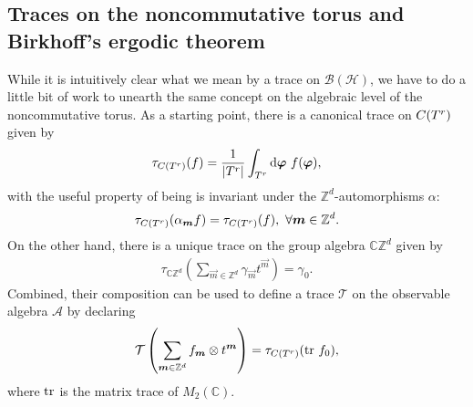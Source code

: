 \documentclass[submission, Phys]{SciPost}
\begin{document}
\subsection{Traces on the noncommutative torus and Birkhoff's ergodic theorem}
\label{subsec:ergodicity}

While it is intuitively clear what we mean by a trace on $\mathcal{B}(\mathcal{H})$, we have to do a little bit of work to unearth the same concept on the algebraic level of the noncommutative torus.
As a starting point, there is a canonical trace on $C(T^r)$ given by
\begin{align}
    \tau_{C(T^r)}(f) = \frac{1}{|T^r|} \int_{T^r}\mathrm{d} \boldsymbol{\varphi} ~ f( \boldsymbol{\varphi}),
\end{align}
with the useful property of being is invariant under the $\mathbb{Z}^d$-automorphisms $\alpha$: 
\begin{equation}
    \tau_{C(T^r)}(\alpha_{\boldsymbol{m}}f) = \tau_{C(T^r)}(f), ~ \forall  \boldsymbol{m}\in \mathbb{Z}^d .
\end{equation}
On the other hand, there is a unique trace on the group algebra $\mathbb{C}\mathbb{Z}^d$ given by
\begin{align}
     \tau_{\mathbb{C}\mathbb{Z}^d}\left( \sum_{\vec{m}\in\mathbb{Z}^d} \gamma_{\vec{m}} t^{\vec{m}}\right) = \gamma_0 .
\end{align}
Combined, their composition can be used to define a trace $\mathcal{T}$ on the observable algebra $\mathcal{A}$  by declaring 
\begin{align}
   \mathcal{T}\left( \sum_{\boldsymbol{m} \in \mathbb{Z}^d} f_{\boldsymbol{m}} \otimes t^{\boldsymbol{m}} \right) = \tau_{C(T^r)}(\mathrm{tr}~f_0) ,
\end{align}
where $\mathrm{tr}$ is the matrix trace of $M_2(\mathbb{C})$.

\end{document}
